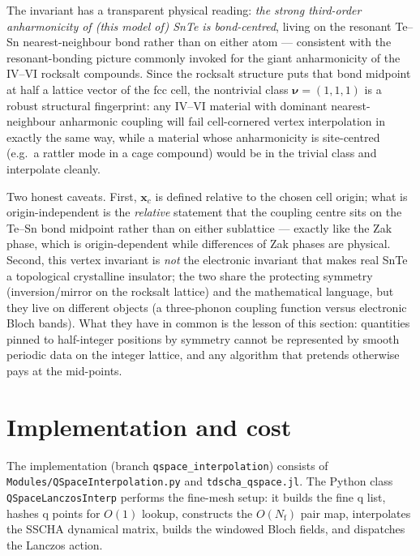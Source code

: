 \documentclass[11pt,a4paper]{article}
\newcommand{\Nf}{N_{\mathrm{f}}}
\begin{document}
The invariant has a transparent physical reading: \emph{the strong
third-order anharmonicity of (this model of) SnTe is bond-centred},
living on the resonant Te--Sn nearest-neighbour bond rather than on
either atom --- consistent with the resonant-bonding picture commonly
invoked for the giant anharmonicity of the IV--VI rocksalt compounds.
Since the rocksalt structure puts that bond midpoint at half a lattice
vector of the fcc cell, the nontrivial class
$\boldsymbol\nu=(1,1,1)$ is a robust structural fingerprint: any
IV--VI material with dominant nearest-neighbour anharmonic coupling
will fail cell-cornered vertex interpolation in exactly the same way,
while a material whose anharmonicity is site-centred (e.g.\ a rattler
mode in a cage compound) would be in the trivial class and interpolate
cleanly.

Two honest caveats.  First, $\mathbf x_c$ is defined relative to the
chosen cell origin; what is origin-independent is the \emph{relative}
statement that the coupling centre sits on the Te--Sn bond midpoint
rather than on either sublattice --- exactly like the Zak phase, which
is origin-dependent while differences of Zak phases are physical.
Second, this vertex invariant is \emph{not} the electronic invariant
that makes real SnTe a topological crystalline insulator; the two share
the protecting symmetry (inversion/mirror on the rocksalt lattice) and
the mathematical language, but they live on different objects (a
three-phonon coupling function versus electronic Bloch bands).  What
they have in common is the lesson of this section: quantities pinned to
half-integer positions by symmetry cannot be represented by smooth
periodic data on the integer lattice, and any algorithm that pretends
otherwise pays at the mid-points.

\section{Implementation and cost}
\label{sec:implementation}

The implementation (branch \texttt{qspace\_interpolation}) consists of
\texttt{Modules/QSpaceInterpolation.py} and \texttt{tdscha\_qspace.jl}.
The Python class \texttt{QSpaceLanczosInterp} performs the fine-mesh setup:
it builds the fine q list, hashes q points for $O(1)$ lookup, constructs the
$O(\Nf)$ pair map, interpolates the SSCHA dynamical matrix, builds the
windowed Bloch fields, and dispatches the Lanczos action.
\end{document}

